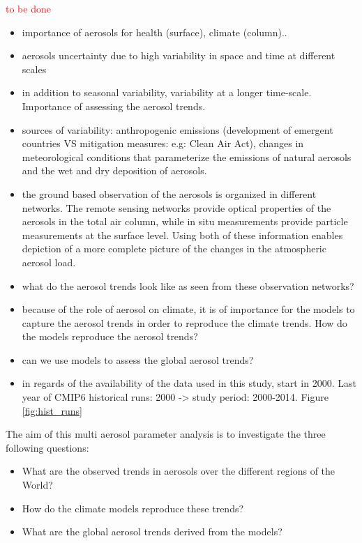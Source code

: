 \documentclass[journal abbreviation, manuscript]{copernicus}
\begin{document}
\introduction  %
\textcolor{red}{to be done}
\begin{itemize}
 \item importance of aerosols for health (surface), climate (column)..
 \item aerosols uncertainty due to high variability in space and time at different scales
 \item in addition to seasonal variability, variability at a longer time-scale. Importance of assessing the aerosol trends.
 \item sources of variability: anthropogenic emissions (development of emergent countries VS mitigation measures: e.g: Clean Air Act), changes in meteorological conditions that parameterize the emissions of natural aerosols and the wet and dry deposition of aerosols.
 \item the ground based observation of the aerosols is organized in different networks. The remote sensing networks provide optical properties of the aerosols in the total air column, while in situ measurements provide particle measurements at the surface level. Using both of these information enables depiction of a more complete picture of the changes in the atmospheric aerosol load.
 \item what do the aerosol trends look like as seen from these observation networks?
 \item because of the role of aerosol on climate, it is of importance for the models to capture the aerosol trends in order to reproduce the climate trends. How do the models reproduce the aerosol trends?
 \item can we use models to assess the global aerosol trends?
 \item in regards of the availability of the data used in this study, start in 2000. Last year of CMIP6 historical runs: 2000 -> study period: 2000-2014. Figure \ref{fig:hist_runs}
\end{itemize}

The aim of this multi aerosol parameter analysis is to investigate the three following questions:
\begin{itemize}
    \item What are the observed trends in aerosols over the different regions of the World?
    \item How do the climate models reproduce these trends?
    \item What are the global aerosol trends derived from the models?
\end{itemize}
\end{document}
